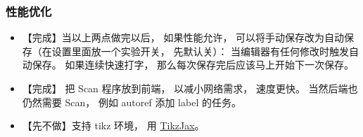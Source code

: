 \subsubsection{性能优化}
\begin{itemize}
\item 【完成】当以上两点做完以后， 如果性能允许， 可以将手动保存改为自动保存（在设置里面放一个实验开关， 先默认关）： 当编辑器有任何修改时触发自动保存。 如果连续快速打字， 那么每次保存完后应该马上开始下一次保存。

\item 【完成】 把 Scan 程序放到前端， 以减小网络需求， 速度更快。 当然后端也仍然需要 Scan， 例如 autoref 添加 label 的任务。

\item 【先不做】支持 tikz 环境， 用 \href{https://github.com/kisonecat/tikzjax}{TikzJax}。
\end{itemize}


